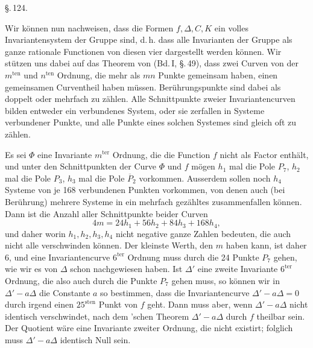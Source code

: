 \begin{center}
§.\,124.

\end{center}

Wir können nun nachweisen, dass die Formen $f, \Delta, C, K$ ein
volles Invariantensystem der Gruppe sind, d.\,h. dass alle Invarianten
der Gruppe als ganze rationale Functionen von diesen vier dargestellt
werden können. Wir stützen uns dabei auf das Theorem von
 (Bd.\,I, §.\,49), dass zwei Curven von der $m^{\text{ten}}$
und $n^{\text{ten}}$ Ordnung, die mehr als $mn$ Punkte gemeinsam haben,
einen gemeinsamen Curventheil haben müssen. Berührungspunkte sind
dabei als doppelt oder mehrfach zu zählen. Alle Schnittpunkte zweier
Invariantencurven bilden entweder ein verbundenes System, oder sie
zerfallen in Systeme verbundener Punkte, und alle Punkte eines
solchen Systemes sind gleich oft zu zählen.

Es sei $\Phi$ eine Invariante $m^{\text{ter}}$ Ordnung, die die Function
$f$ nicht als Factor enthält, und unter den Schnittpunkten der Curve
$\Phi$ und $f$ mögen $h_1$ mal die Pole $P_7$, $h_2$ mal die Pole $P_3$,
$h_3$ mal die Pole $\overline{P}_2$ vorkommen. Ausserdem sollen noch $h_4$
Systeme von je 168 verbundenen Punkten vorkommen, von denen auch
(bei Berührung) mehrere Systeme in ein mehrfach gezähltes zusammenfallen
können. Dann ist die Anzahl aller Schnittpunkte beider Curven
\[
4m = 24h_1 + 56h_2 + 84h_3 + 168h_4,
\]
und daher
worin $h_1, h_2, h_3, h_4$ nicht negative ganze Zahlen bedeuten, die
auch nicht alle verschwinden können. Der kleinste Werth, den $m$
haben kann, ist daher 6, und eine Invariantencurve $6^{\text{ter}}$
Ordnung muss durch die 24 Punkte $P_7$ gehen, wie wir es von $\Delta$
schon nachgewiesen haben. Ist $\Delta'$ eine zweite Invariante
$6^{\text{ter}}$ Ordnung, die also auch durch die Punkte $P_7$ gehen
muss, so können wir in $\Delta' - a\Delta$ die Constante $a$ so
bestimmen, dass die Invariantencurve $\Delta' - a\Delta = 0$ durch
irgend einen $25^{\text{sten}}$ Punkt von $f$ geht. Dann muss aber, wenn
$\Delta' - a\Delta$ nicht identisch verschwindet, nach dem
'schen Theorem $\Delta' - a\Delta$ durch $f$ theilbar
sein. Der Quotient wäre eine Invariante zweiter Ordnung, die nicht
existirt; folglich muss $\Delta' - a\Delta$ identisch Null sein.
